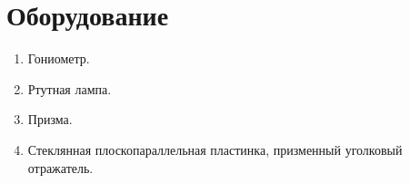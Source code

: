 \section*{Оборудование}

\begin{enumerate}
	\item Гониометр.
	
	\item Ртутная лампа.
	
	\item Призма.
	
	\item Стеклянная плоскопараллельная пластинка, призменный уголковый отражатель.
\end{enumerate}